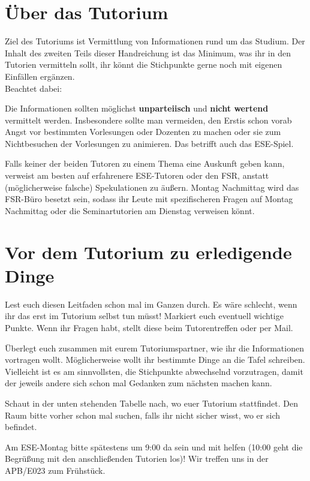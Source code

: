 \documentclass[a4paper,12pt]{report}
\begin{document}
\section{Über das Tutorium}
Ziel des Tutoriums ist Vermittlung von Informationen rund um das Studium. Der Inhalt des zweiten Teils dieser Handreichung ist das Minimum, was ihr in den Tutorien vermitteln sollt, ihr könnt die Stichpunkte gerne noch mit eigenen Einfällen ergänzen.\\
Beachtet dabei:
\begin{itemize*}
	\item Die Informationen sollten möglichst \textbf{unparteiisch} und \textbf{nicht wertend} vermittelt werden.
	Insbesondere sollte man vermeiden, den Erstis schon vorab Angst vor bestimmten Vorlesungen oder Dozenten zu machen oder sie zum Nichtbesuchen der Vorlesungen zu animieren. Das betrifft auch das ESE-Spiel.
	\item Falls keiner der beiden Tutoren zu einem Thema eine Auskunft geben kann, verweist am besten auf erfahrenere ESE-Tutoren oder den FSR, anstatt (möglicherweise falsche) Spekulationen zu äußern. Montag Nachmittag wird das FSR-Büro besetzt sein, sodass ihr Leute mit spezifischeren Fragen auf Montag Nachmittag oder die Seminartutorien am Dienstag verweisen könnt.
\end{itemize*}

\section{Vor dem Tutorium zu erledigende Dinge}
\begin{itemize*}
\item Lest euch diesen Leitfaden schon mal im Ganzen durch. 
Es wäre schlecht, wenn ihr das erst im Tutorium selbst tun müsst! 
Markiert euch eventuell wichtige Punkte.
Wenn ihr Fragen habt, stellt diese beim Tutorentreffen oder per Mail.
\item Überlegt euch zusammen mit eurem Tutoriumspartner, wie ihr die Informationen vortragen wollt.
Möglicherweise wollt ihr bestimmte Dinge an die Tafel schreiben.
Vielleicht ist es am sinnvollsten, die Stichpunkte abwechselnd vorzutragen, damit der jeweils andere sich schon mal Gedanken zum nächsten machen kann.
\item Schaut in der unten stehenden Tabelle nach, wo euer Tutorium stattfindet. Den Raum bitte vorher schon mal suchen, falls ihr nicht sicher wisst, wo er sich befindet.
\item Am ESE-Montag bitte spätestens um 9:00 da sein und mit helfen (10:00 geht die Begrüßung mit den anschließenden Tutorien los)!
Wir treffen uns in der APB/E023 zum Frühstück.	
\end{itemize*}
\end{document}
